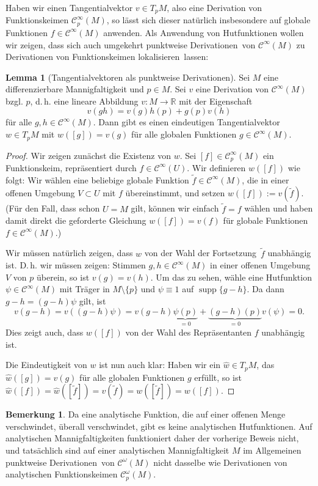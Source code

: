 \documentclass[a4paper]{scrreprt}
\numberwithin{equation}{chapter}
\DeclareMathOperator{\supp}{supp}
\newcommand{\R}{\mathbb{R}}
\newcommand{\sC}{\mathcal{C}^{\infty}}
\theoremstyle{definition}
\newtheorem{lemma}[defn]{Lemma}
\newtheorem{bem}[defn]{Bemerkung}
\begin{document}
Haben wir einen Tangentialvektor $v \in T_pM$, also eine Derivation von Funktionskeimen $\sC_p(M)$, so lässt sich dieser natürlich insbesondere auf globale Funktionen $f \in \sC(M)$ anwenden. Als Anwendung von Hutfunktionen wollen wir zeigen, dass sich auch umgekehrt \glqq punktweise Derivationen\grqq\ von $\sC(M)$ zu Derivationen von Funktionskeimen \glqq lokalisieren\grqq\ lassen:
\begin{lemma}[Tangentialvektoren als punktweise Derivationen] \label{lemma:tangtvek_punktw_deriv}
	Sei $M$ eine differenzierbare Mannigfaltigkeit und $p\in M$. Sei $v$ eine Derivation von $\sC(M)$ bzgl. $p$, d.\,h. eine lineare Abbildung $v\colon M \to \R$ mit der Eigenschaft \[v(gh) = v(g) h(p) + g(p) v(h)\] für alle $g,h \in \sC(M)$. Dann gibt es einen eindeutigen Tangentialvektor $w \in T_pM$ mit $w([g]) = v(g)$ für alle globalen Funktionen $g \in \sC(M)$.

	\begin{proof}
		Wir zeigen zunächst die Existenz von $w$. Sei $[f] \in \sC_p(M)$ ein Funktionskeim, repräsentiert durch $f\in \sC(U)$. Wir definieren $w([f])$ wie folgt: Wir wählen eine beliebige globale Funktion $\tilde f \in \sC(M)$, die in einer offenen Umgebung $V \subset U$ mit $f$ übereinstimmt, und setzen $w([f]) := v(\tilde f)$. (Für den Fall, dass schon $U=M$ gilt, können wir einfach $\tilde f = f$ wählen und haben damit direkt die geforderte Gleichung $w([f]) = v(f)$ für globale Funktionen $f \in \sC(M)$.)

		Wir müssen natürlich zeigen, dass $w$ von der Wahl der \glqq Fortsetzung\grqq\ $\tilde f$ unabhängig ist. D.\,h. wir müssen zeigen: Stimmen $g,h \in \sC(M)$ in einer offenen Umgebung $V$ von $p$ überein, so ist $v(g) = v(h)$. Um das zu sehen, wähle eine Hutfunktion $\psi \in \sC(M)$ mit Träger in $M\setminus \{p\}$ und $\psi \equiv 1$ auf $\supp\{g - h\}$. Da dann $g-h = (g-h)\psi$ gilt, ist \[v(g-h) = v((g-h)\psi) = v(g-h) \underbrace{\psi(p)}_{=0} + \underbrace{(g-h)(p)}_{=0} v(\psi) = 0.\]
		Dies zeigt auch, dass $w([f])$ von der Wahl des Repräsentanten $f$ unabhängig ist.

		Die Eindeutigkeit von $w$ ist nun auch klar: Haben wir ein $\hat w \in T_pM$, das $\hat w([g]) = v(g)$ für alle globalen Funktionen $g$ erfüllt, so ist $\hat w([f]) = \hat w([\tilde f]) = v(\tilde f) = w([\tilde f]) = w([f])$.
	\end{proof}
\end{lemma}

\begin{bem}
	Da eine analytische Funktion, die auf einer offenen Menge verschwindet, überall verschwindet, gibt es keine analytischen Hutfunktionen. Auf analytischen Mannigfaltigkeiten funktioniert daher der vorherige Beweis nicht, und tatsächlich sind auf einer analytischen Mannigfaltigkeit $M$ im Allgemeinen \glqq punktweise Derivationen\grqq\ von $\mathcal C^\omega(M)$ nicht dasselbe wie Derivationen von analytischen Funktionskeimen $\mathcal C^\omega_p(M)$.
\end{bem}
\end{document}
